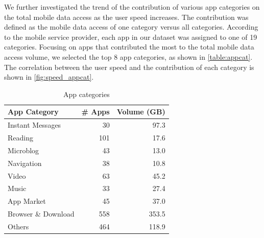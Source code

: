 We further investigated the trend of the contribution of various app categories on the total mobile data access as the user speed increases.
The contribution was defined as the mobile data access of one category versus all categories.
According to the mobile service provider, each app in our dataset was assigned to one of 19 categories.
Focusing on apps that contributed the most to the total mobile data access volume,
we selected the top 8 app categories, as shown in \autoref{table:appcat}.
The correlation between the user speed and the contribution of each category is shown in \autoref{fig:speed_appcat}.
\begin{table}
	\centering
	\begin{tabular}{lrr}\hline
	App Category & \# Apps & Volume (GB) \\
    \hline
	Instant Messages & 30 & 97.3\\
	Reading & 101 & 17.6\\
	Microblog & 43 & 13.0\\
	Navigation & 38 & 10.8\\
	Video & 63 & 45.2\\
	Music & 33 & 27.4\\
	App Market & 45 & 37.0\\
	Browser \& Download & 558 & 353.5\\
	Others & 464 & 118.9\\
    \hline
	\end{tabular}
	\caption{App categories}
	\label{table:appcat}
\end{table}

